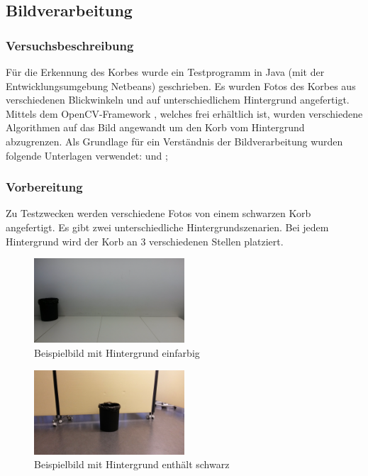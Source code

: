 \subsection{Bildverarbeitung}

\subsubsection{Versuchsbeschreibung}
Für die Erkennung des Korbes wurde ein Testprogramm in Java (mit der Entwicklungsumgebung Netbeans) geschrieben. Es wurden Fotos des Korbes aus verschiedenen Blickwinkeln und auf unterschiedlichem Hintergrund angefertigt. Mittels dem OpenCV-Framework \cite{img:netbeans}, welches frei erhältlich ist, wurden verschiedene Algorithmen auf das Bild angewandt um den Korb vom Hintergrund abzugrenzen. Als Grundlage für ein Verständnis der Bildverarbeitung wurden folgende Unterlagen verwendet: \cite{img:info} und \cite{img:help};

\subsubsection{Vorbereitung}
Zu Testzwecken werden verschiedene Fotos von einem schwarzen Korb angefertigt. 
Es gibt zwei unterschiedliche Hintergrundszenarien. Bei jedem Hintergrund wird der 
Korb an 3 verschiedenen Stellen platziert.

\begin{figure}[h!]
    \centering
    \includegraphics[width=0.5\textwidth]{fig/korb4.jpg}
    \caption{Beispielbild mit Hintergrund einfarbig}
    \label{fig:Korb_HEinfarbig}
\end{figure}

\begin{figure}[h!]
    \centering
    \includegraphics[width=0.5\textwidth]{fig/korb1.jpg}
    \caption{Beispielbild mit Hintergrund enthält schwarz}
    \label{fig:Korb_HSchwarz}
\end{figure}

